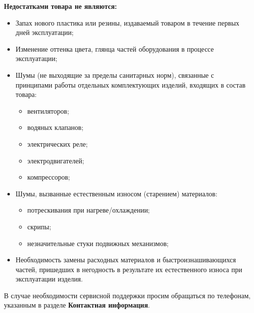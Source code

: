 {    \textbf{Недостатками товара не являются:}
    \begin{itemize}
        \renewcommand{\labelitemi}{\bf--}
        \item Запах нового пластика или резины, издаваемый товаром в течение первых дней эксплуатации;
        \item Изменение оттенка цвета, глянца частей оборудования в процессе эксплуатации;
        \item Шумы (не выходящие за пределы санитарных норм), связанные с принципами работы отдельных комплектующих изделий, 
    входящих в состав товара:
        \begin{itemize}
            \item вентиляторов;
            \item водяных клапанов;
            \item электрических реле;
            \item электродвигателей;
            \item компрессоров;     
        \end{itemize}
        \item Шумы, вызванные естественным износом (старением) материалов:
        \begin{itemize}
            \item потрескивания при нагреве/охлаждении;
            \item скрипы;
            \item незначительные стуки подвижных механизмов;
        \end{itemize}
        
        \item Необходимость замены расходных материалов и быстроизнашивающихся частей, пришедших
    в негодность в результате их естественного износа при эксплуатации изделия.
    \end{itemize}
    
    В случае необходимости сервисной поддержки просим обращаться по телефонам, указанным в разделе \textbf{Контактная информация}.
    \newpage     

}
\fi
\ifIsLngEng  %
